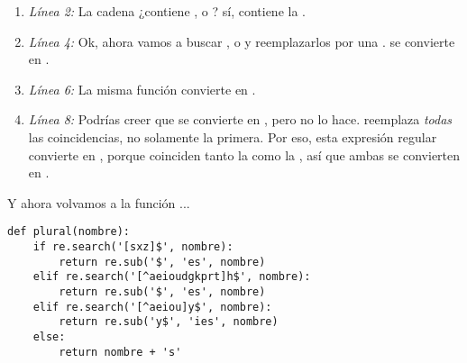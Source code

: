 \begin{enumerate}

\item \emph{Línea 2:} La cadena  ¿contiene ,  o ? sí, contiene la .

\item \emph{Línea 4:} Ok, ahora vamos a buscar ,  o  y reemplazarlos por una .  se convierte en .

\item \emph{Línea 6:} La misma función convierte  en .

\item \emph{Línea 8:} Podrías creer que  se convierte en , pero no lo hace.  reemplaza \emph{todas} las coincidencias, no solamente la primera. Por eso, esta expresión regular convierte  en , porque coinciden tanto la  como la , así que ambas se convierten en .

\end{enumerate}

Y ahora volvamos a la función ...

\noindent\begin{minipage}{\textwidth}
\begin{lstlisting}[mathescape=False]
def plural(nombre):          
    if re.search('[sxz]$', nombre):            
        return re.sub('$', 'es', nombre)
    elif re.search('[^aeioudgkprt]h$', nombre):
        return re.sub('$', 'es', nombre)
    elif re.search('[^aeiou]y$', nombre):
        return re.sub('y$', 'ies', nombre)     
    else:
        return nombre + 's'
\end{lstlisting}
\end{minipage}

